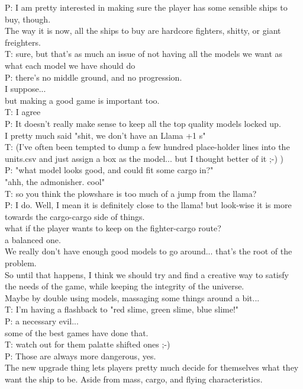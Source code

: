P: I am pretty interested in making sure the player has some sensible ships to buy, though.\\
The way it is now, all the ships to buy are hardcore fighters, shitty, or giant freighters.\\
T: sure, but that's as much an issue of not having all the models we want as what each model we have should do\\
P: there's no middle ground, and no progression.\\
I suppose...\\
but making a good game is important too.\\
T: I agree\\
P: It doesn't really make sense to keep all the top quality models locked up.\\
I pretty much said "shit, we don't have an Llama +1 s"\\
T: (I've often been tempted to dump a few hundred place-holder lines into the units.csv and just assign a box as the model... but I thought better of it ;-) )\\
P: "what model looks good, and could fit some cargo in?"\\
"ahh, the admonisher. cool"\\
T: so you think the plowshare is too much of a jump from the llama?\\
P: I do. Well, I mean it is definitely close to the llama! but look-wise it is more towards the cargo-cargo side of things.\\
what if the player wants to keep on the fighter-cargo route?\\
a balanced one.\\
We really don't have enough good models to go around... that's the root of the problem.\\
So until that happens, I think we should try and find a creative way to satisfy the needs of the game, while keeping the integrity of the universe.\\
Maybe by double using models, massaging some things around a bit...\\
T: I'm having a flashback to "red slime, green slime, blue slime!"\\
P: a necessary evil...\\
some of the best games have done that.\\
T: watch out for them palatte shifted ones ;-)\\
P: Those are always more dangerous, yes.\\
The new upgrade thing lets players pretty much decide for themselves what they want the ship to be. Aside from mass, cargo, and flying characteristics.\\
